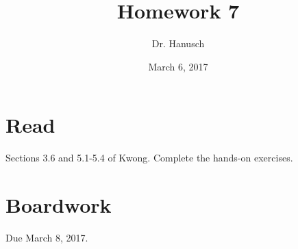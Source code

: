 \documentclass[12pt]{article}
\title{Homework 7}
\author{Dr. Hanusch}  %
\date{March 6, 2017}
\begin{document}
\newtheorem{thm}{Theorem}[section]
\newtheorem{cor}[thm]{Corollary}
\newtheorem{lem}[thm]{Lemma}
\newtheorem{prop}[thm]{Proposition}
\theoremstyle{definition}
\newtheorem{defn}[thm]{Definition}
\newtheorem{qu}[]{Question}
\theoremstyle{remark}
\newtheorem{rem}[thm]{Remark}
\newtheorem*{prf}{Proof}

\newcommand{\norm}[1]{\left\Vert#1\right\Vert}
\newcommand{\abs}[1]{\left\vert#1\right\vert}
\newcommand{\set}[1]{\left\{#1\right\}}
\newcommand{\Real}{\mathbb R}
\newcommand{\Zee}{\mathbb Z}
\newcommand{\eps}{\varepsilon}
\newcommand{\To}{\longrightarrow}
\newcommand{\BX}{\mathbf{B}(X)}
\newcommand{\A}{\mathcal{A}}
\newcommand{\U}{\mathcal{U}}
\newcommand{\power}{\mathscr{P}}




\maketitle

\section{Read}

Sections 3.6 and 5.1-5.4 of Kwong. Complete the hands-on exercises.

\section{Boardwork} 

Due March 8, 2017.

\end{document}
